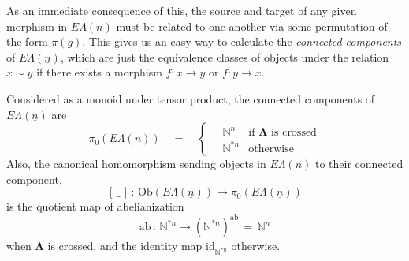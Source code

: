 \documentclass{amsbook} %
\newcommand{\ML}{\mathbf{\Lambda}}
\newcommand{\ELn}{E\Lambda(\underline{n})}
\numberwithin{section}{chapter}
\begin{document}
As an immediate consequence of this, the source and target of any given morphism in $\ELn$ must be related to one another via some permutation of the form $\pi(g)$. This gives us an easy way to calculate the \emph{connected components} of $\ELn$, which are just the equivalence classes of objects under the relation $x \sim y$ if there exists a morphism $f: x \to y$ or $f:y \to x$.
\begin{prop}\label{Gnconcomp} Considered as a monoid under tensor product, the connected components of $\ELn$ are
\[ \pi_0(\ELn) \quad = \quad \begin{cases}
							\quad \mathbb{N}^n & \text{if $\ML$ is crossed} \\
							\quad \mathbb{N}^{\ast n} & \text{otherwise}
							\end{cases}
 \] 
Also, the canonical homomorphism sending objects in $\ELn$ to their connected component,
\[ [ \, \_ \, ] \, : \, \mathrm{Ob}(\ELn) \to \pi_0(\ELn) \]
is the quotient map of abelianization
\[ \mathrm{ab} \, : \, \mathbb{N}^{*n} \to (\mathbb{N}^{*n})^{\mathrm{ab}} \, = \, \mathbb{N}^n \]
when $\ML$ is crossed, and the identity map $\mathrm{id}_{\mathbb{N}^{*n}}$ otherwise.
\end{prop}
\end{document}
